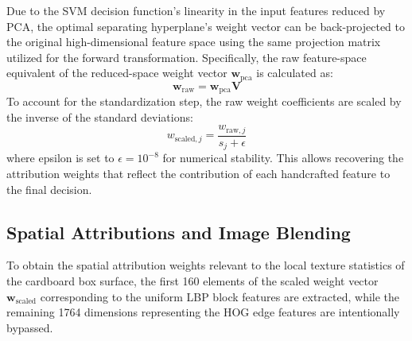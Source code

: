 Due to the SVM decision function's linearity in the input features reduced by PCA, the optimal separating hyperplane's weight vector can be back-projected to the original high-dimensional feature space using the same projection matrix utilized for the forward transformation. Specifically, the raw feature-space equivalent of the reduced-space weight vector $\mathbf{w}_{\text{pca}}$ is calculated as:
\begin{equation}
\mathbf{w}_{\text{raw}} = \mathbf{w}_{\text{pca}} \mathbf{V} \label{eq:xai_back_projection}
\end{equation}
To account for the standardization step, the raw weight coefficients are scaled by the inverse of the standard deviations:
\begin{equation}
w_{\text{scaled}, j} = \frac{w_{\text{raw}, j}}{s_j + \epsilon} \label{eq:scaling_reversal}
\end{equation}
where epsilon is set to $\epsilon = 10^{-8}$ for numerical stability. This allows recovering the attribution weights that reflect the contribution of each handcrafted feature to the final decision.

\subsection{Spatial Attributions and Image Blending}

To obtain the spatial attribution weights relevant to the local texture statistics of the cardboard box surface, the first 160 elements of the scaled weight vector $\mathbf{w}_{\text{scaled}}$ corresponding to the uniform LBP block features are extracted, while the remaining 1764 dimensions representing the HOG edge features are intentionally bypassed. 

